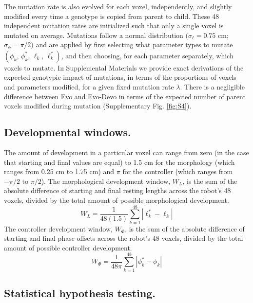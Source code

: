 The mutation rate is also evolved for each voxel, independently, and slightly modified every time a genotype is copied from parent to child.
These 48 independent mutation rates are initialized such that only a single voxel is mutated on average.
Mutations follow a normal distribution $(\sigma_{\ell}=0.75$ cm; $\sigma_{\phi}=\pi/2)$ and are applied by first selecting what parameter types to mutate $(\phi_k,\, \phi_k^*,\, \ell_k,\, \ell_k^*)$, and then choosing, for each parameter separately, which voxels to mutate. 
In Supplemental Materials we provide exact derivations of the expected genotypic impact of mutations, in terms of the proportions of voxels and parameters modified, for a given fixed mutation rate $\lambda$.
There is a negligible difference between Evo and Evo-Devo in terms of the expected number of parent voxels modified during mutation (Supplementary Fig. \ref{fig:S4}).%


\subsection*{Developmental windows.}

The amount of development in a particular voxel can range from zero (in the case that starting and final values are equal) to 1.5 cm for the morphology (which ranges from 0.25 cm to 1.75 cm) and $\pi$ for the controller (which ranges from $-\pi/2$ to $\pi/2$). 
The morphological development window, $W_L$, is the sum of the absolute difference of starting and final resting lengths across the robot's 48 voxels, divided by the total amount of possible morphological development.
\begin{equation}
W_L = \frac{1}{48(1.5)} \sum_{k=1}^{48} |\ell^*_k-\ell_k|
\label{eq-WL}
\end{equation}
The controller development window, $W_{\Phi}$, is the sum of the absolute difference of starting and final phase offsets across the robot's 48 voxels, divided by the total amount of possible controller development. 
\begin{equation}
W_{\Phi} = \frac{1}{48\pi} \sum_{k=1}^{48} |\phi^*_k-\phi_k|
\label{eq-WPhi}
\end{equation}


\subsection*{Statistical hypothesis testing.}

